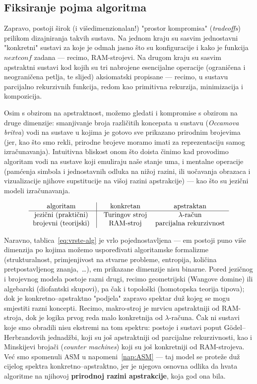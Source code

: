 \subsection{Fiksiranje pojma algoritma}

Zapravo, postoji širok (i višedimenzionalan!) "prostor kompromisa" (\emph{tradeoffs}) prilikom dizajniranja takvih sustava. Na jednom kraju su sasvim jednostavni "konkretni" sustavi za koje je odmah jasno što su konfiguracije i kako je funkcija $nextconf$ zadana --- recimo, RAM-strojevi. Na drugom kraju su sasvim apstraktni sustavi kod kojih su tri nabrojene esencijalne operacije (ograničena i neograničena petlja, te slijed) aksiomatski propisane --- recimo, u sustavu parcijalno rekurzivnih funkcija, redom kao primitivna rekurzija, minimizacija i kompozicija.

Osim s obzirom na apstraktnost, možemo gledati i kompromise s obzirom na druge dimenzije: smanjivanje broja različitih koncepata u sustavu (\emph{Occamova britva}) vodi na sustave u kojima je gotovo sve prikazano prirodnim brojevima (jer, kao što smo rekli, prirodne brojeve moramo imati za reprezentaciju samog izračunavanja). Intuitivna bliskost onom što doista činimo kad provodimo algoritam vodi na sustave koji emuliraju naše stanje uma, i mentalne operacije (pamćenja simbola i jednostavnih odluka na nižoj razini, ili uočavanja obrazaca i vizualizacije njihove supstitucije na višoj razini apstrakcije) --- kao što su jezični modeli izračunavanja.

\begin{equation}\label{eq:vrste-alg}
    \begin{tabular}{c@{\quad}|@{\quad}cc}
     algoritam & konkretan & apstraktan \\\hline
     jezični (praktični) & Turingov stroj & $\lambda$-račun\\
     brojevni (teorijski) & RAM-stroj & parcijalna rekurzivnost
    \end{tabular}
\end{equation}

Naravno, tablica~\eqref{eq:vrste-alg} je vrlo pojednostavljena --- em postoji puno više dimenzija po kojima možemo uspoređivati algoritamske formalizme (strukturalnost, primjenjivost na stvarne probleme, entropija, količina pretpostavljenog znanja,~\ldots), em prikazane dimenzije nisu binarne. Pored jezičnog i brojevnog modela postoje razni drugi, recimo geometrijski (Wangove domine) ili algebarski (diofantski skupovi), pa čak i topološki (homotopska teorija tipova); dok je konkretno--apstraktno "podjela" zapravo spektar duž kojeg se mogu smjestiti razni koncepti. Recimo, makro-stroj je mrvicu apstraktniji od RAM-stroja, dok je logika prvog reda malo konkretnija od $\lambda$-računa. Čak ni sustavi koje smo obradili nisu ekstremi na tom spektru: postoje i sustavi poput G\"odel--Herbrandovih jednadžbi, koji su još apstraktniji od parcijalne rekurzivnosti, kao i Minskijevi brojači (\emph{counter machines}) koji su još konkretniji od RAM-strojeva. Već smo spomenuli ASM u napomeni~\ref{nap:ASM} --- taj model se proteže duž cijelog spektra konkretno--apstraktno, jer je njegova osnovna odlika da hvata algoritme na njihovoj \textbf{prirodnoj razini apstrakcije}, koja god ona bila.

